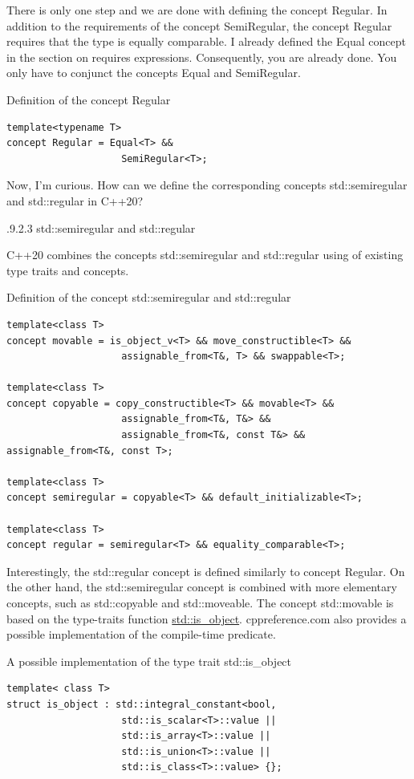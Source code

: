 There is only one step and we are done with defining the concept Regular. In addition to the requirements of the concept SemiRegular, the concept Regular requires that the type is equally comparable. I already defined the Equal concept in the section on requires expressions. Consequently, you are already done. You only have to conjunct the concepts Equal and SemiRegular.

\noindent
Definition of the concept Regular
\begin{lstlisting}[style=styleCXX]
template<typename T>
concept Regular = Equal<T> &&
					SemiRegular<T>;
\end{lstlisting}

Now, I’m curious. How can we define the corresponding concepts std::semiregular and std::regular in C++20?

.9.2.3\hspace{0.2cm} std::semiregular and std::regular

C++20 combines the concepts std::semiregular and std::regular using of existing type traits and concepts.

\noindent
Definition of the concept std::semiregular and std::regular
\begin{lstlisting}[style=styleCXX]
template<class T>
concept movable = is_object_v<T> && move_constructible<T> &&
					assignable_from<T&, T> && swappable<T>;

template<class T>
concept copyable = copy_constructible<T> && movable<T> &&
					assignable_from<T&, T&> &&
					assignable_from<T&, const T&> && assignable_from<T&, const T>;

template<class T>
concept semiregular = copyable<T> && default_initializable<T>;

template<class T>
concept regular = semiregular<T> && equality_comparable<T>;
\end{lstlisting}

Interestingly, the std::regular concept is defined similarly to concept Regular. On the other hand, the std::semiregular concept is combined with more elementary concepts, such as std::copyable and std::moveable. The concept std::movable is based on the type-traits function \href{https://en.cppreference.com/w/cpp/types/is_object}{std::is\_object}. cppreference.com also provides a possible implementation of the compile-time predicate.

\noindent
A possible implementation of the type trait std::is\_object
\begin{lstlisting}[style=styleCXX]
template< class T>
struct is_object : std::integral_constant<bool,
					std::is_scalar<T>::value ||
					std::is_array<T>::value ||
					std::is_union<T>::value ||
					std::is_class<T>::value> {};
\end{lstlisting}

